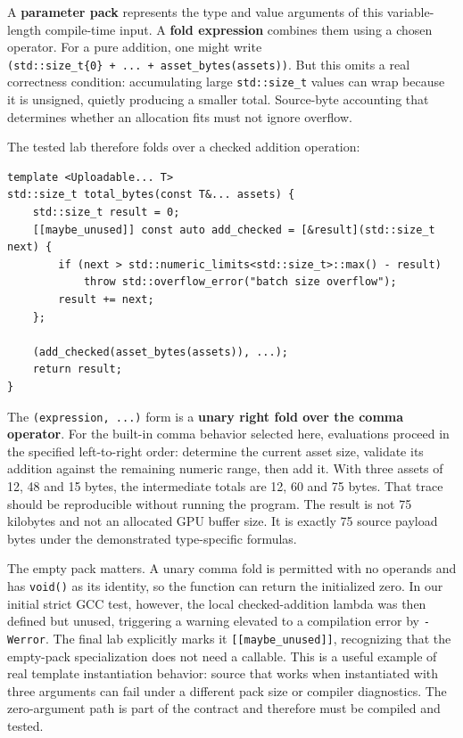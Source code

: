 A \textbf{parameter pack} represents the type and value arguments of this variable-length compile-time input. A \textbf{fold expression} combines them using a chosen operator. For a pure addition, one might write \texttt{(std::size\_t\{0\}\ +\ ...\ +\ asset\_bytes(assets))}. But this omits a real correctness condition: accumulating large \texttt{std::size\_t} values can wrap because it is unsigned, quietly producing a smaller total. Source-byte accounting that determines whether an allocation fits must not ignore overflow.

The tested lab therefore folds over a checked addition operation:

\begin{verbatim}
template <Uploadable... T>
std::size_t total_bytes(const T&... assets) {
    std::size_t result = 0;
    [[maybe_unused]] const auto add_checked = [&result](std::size_t next) {
        if (next > std::numeric_limits<std::size_t>::max() - result)
            throw std::overflow_error("batch size overflow");
        result += next;
    };

    (add_checked(asset_bytes(assets)), ...);
    return result;
}
\end{verbatim}

The \texttt{(expression,\ ...)} form is a \textbf{unary right fold over the comma operator}. For the built-in comma behavior selected here, evaluations proceed in the specified left-to-right order: determine the current asset size, validate its addition against the remaining numeric range, then add it. With three assets of 12, 48 and 15 bytes, the intermediate totals are 12, 60 and 75 bytes. That trace should be reproducible without running the program. The result is not 75 kilobytes and not an allocated GPU buffer size. It is exactly 75 source payload bytes under the demonstrated type-specific formulas.

The empty pack matters. A unary comma fold is permitted with no operands and has \texttt{void()} as its identity, so the function can return the initialized zero. In our initial strict GCC test, however, the local checked-addition lambda was then defined but unused, triggering a warning elevated to a compilation error by \texttt{-Werror}. The final lab explicitly marks it \texttt{{[}{[}maybe\_unused{]}{]}}, recognizing that the empty-pack specialization does not need a callable. This is a useful example of real template instantiation behavior: source that works when instantiated with three arguments can fail under a different pack size or compiler diagnostics. The zero-argument path is part of the contract and therefore must be compiled and tested.

